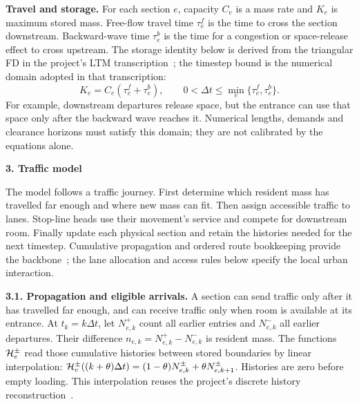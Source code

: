 \documentclass[10pt,a4paper]{article}
\newcommand{\head}[1]{\par\vspace{4pt}\noindent\textbf{#1}\par\nobreak\vspace{1pt}}
\begin{document}
\par\begin{samepage}
\textbf{Travel and storage.} For each section $e$, capacity $C_e$ is a
mass rate and $K_e$ is maximum stored mass. Free-flow travel time
$\tau^f_e$ is the time to cross the section downstream. Backward-wave
time $\tau^b_e$ is the time for a congestion or space-release effect to
cross upstream. The storage identity below is
derived from the triangular FD in the project's LTM transcription~\cite{m0};
the timestep bound is the numerical domain adopted in that transcription:
\begin{equation}
 K_e=C_e(\tau^f_e+\tau^b_e),\qquad
 0<\Delta t\leq\min_e\{\tau^f_e,\tau^b_e\}.
 \label{eq:compact-domain}
\end{equation}
For example, downstream departures release space, but the entrance can
use that space only after the backward wave reaches it. Numerical
lengths, demands and clearance horizons must satisfy this domain;
they are not calibrated by the equations alone.
\par\end{samepage}

\head{3. Traffic model}
The model follows a traffic journey. First determine which resident
mass has travelled far enough and where new mass can fit. Then assign
accessible traffic to lanes. Stop-line heads use their movement's service
and compete for downstream room. Finally update each physical section
and retain the histories needed for the next timestep.
Cumulative propagation and ordered route bookkeeping provide the
backbone~\cite{m0,m1}; the lane allocation and access rules below specify
the local urban interaction.

\textbf{3.1. Propagation and eligible arrivals.}
A section can send traffic only after it has travelled far enough, and
can receive traffic only when room is available at its entrance.
At $t_k=k\Delta t$, let $N^+_{e,k}$ count all earlier entries and
$N^-_{e,k}$ all earlier departures. Their difference
$n_{e,k}=N^+_{e,k}-N^-_{e,k}$ is resident mass.
The functions ${\cal H}^{\pm}_e$ read those cumulative histories between
stored boundaries by linear interpolation:
${\cal H}^{\pm}_e((k+\theta)\Delta t)
=(1-\theta)N^\pm_{e,k}+\theta N^\pm_{e,k+1}$.
Histories are zero before empty loading.
This interpolation reuses the project's discrete history reconstruction~\cite{m0,m1}.
\end{document}
